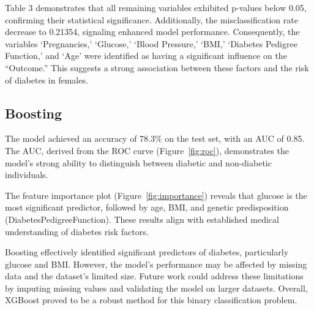 \documentclass[12pt]{article}
\begin{document}
Table 3 demonstrates that all remaining variables exhibited p-values below 0.05, confirming their statistical significance. Additionally, the misclassification rate decrease to 0.21354, signaling enhanced model performance. Consequently, the variables ‘Pregnancies,’ ‘Glucose,’ ‘Blood Pressure,’ ‘BMI,’ ‘Diabetes Pedigree Function,’ and ‘Age’ were identified as having a significant influence on the “Outcome.” This suggests a strong association between these factors and the risk of diabetes in females.

\subsection{Boosting}

The model achieved an accuracy of 78.3\% on the test set, with an AUC of 0.85. The AUC, derived from the ROC curve (Figure~\ref{fig:roc}), demonstrates the model's strong ability to distinguish between diabetic and non-diabetic individuals.

The feature importance plot (Figure~\ref{fig:importance}) reveals that glucose is the most significant predictor, followed by age, BMI, and genetic predisposition (DiabetesPedigreeFunction). These results align with established medical understanding of diabetes risk factors.


Boosting effectively identified significant predictors of diabetes, particularly glucose and BMI. However, the model's performance may be affected by missing data and the dataset's limited size. Future work could address these limitations by imputing missing values and validating the model on larger datasets. Overall, XGBoost proved to be a robust method for this binary classification problem.
\end{document}

